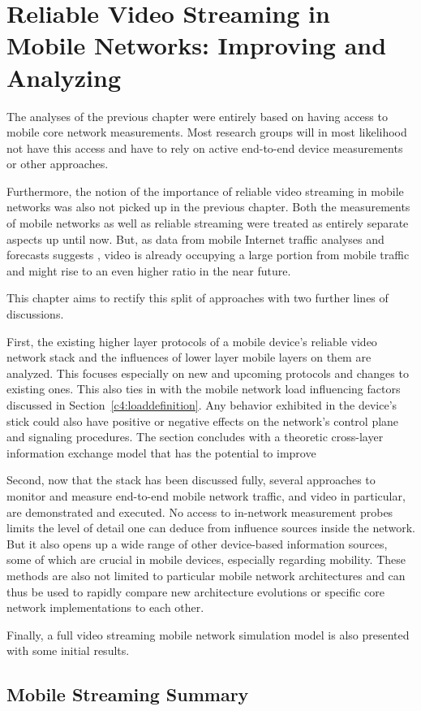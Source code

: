 \chapter{Reliable Video Streaming in Mobile Networks: Improving and Analyzing}
\label{chap:mobilestreaming}

The analyses of the previous chapter were entirely based on having access to mobile core network measurements. Most research groups will in most likelihood not have this access and have to rely on active end-to-end device measurements or other approaches.

Furthermore, the notion of the importance of reliable video streaming in mobile networks was also not picked up in the previous chapter. Both the measurements of mobile networks as well as reliable streaming were treated as entirely separate aspects up until now. But, as data from mobile Internet traffic analyses and forecasts suggests \cite{cisco2014VNI}, video is already occupying a large portion from mobile traffic and might rise to an even higher ratio in the near future.

This chapter aims to rectify this split of approaches with two further lines of discussions. 

First, the existing higher layer protocols of a mobile device's reliable video network stack and the influences of lower layer mobile layers on them are analyzed. This focuses especially on new and upcoming protocols and changes to existing ones. This also ties in with the mobile network load influencing factors discussed in Section~\ref{c4:loaddefinition}. Any behavior exhibited in the device's stick could also have positive or negative effects on the network's control plane and signaling procedures. The section concludes with a theoretic cross-layer information exchange model that has the potential to improve 

Second, now that the stack has been discussed fully, several approaches to monitor and measure end-to-end mobile network traffic, and video in particular, are demonstrated and executed. No access to in-network measurement probes limits the level of detail one can deduce from influence sources inside the network. But it also opens up a wide range of other device-based information sources, some of which are crucial in mobile devices, especially regarding mobility. These methods are also not limited to particular mobile network architectures and can thus be used to rapidly compare new architecture evolutions or specific core network implementations to each other. 

Finally, a full video streaming mobile network simulation model is also presented with some initial results.







\section{Mobile Streaming Summary}



